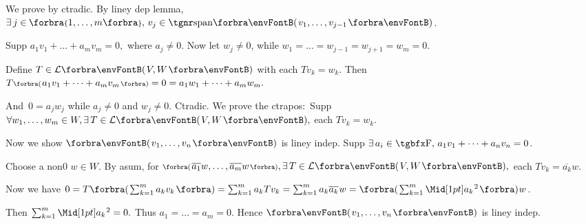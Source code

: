 \par\quad
We prove by ctradic. By liney dep lemma, $\exists\,j\in\;\!\!\Bra{1,\dots,m},\,v_j\in\Span{v_1,\dots,v_{j-1}}$.\par\quad
Supp $a_1 v_1+\dots+a_m v_m=0,$ where $a_j\neq 0.$ \;Now let $w_j\neq 0$, while $w_1=\dots=w_{j-1}=w_{j+1}=w_m=0.$\par\quad
Define $T\in\Lm{V,W}$ with each $Tv_k=w_k$. Then $T\BigPar{a_1 v_1+\dots+a_m v_m}=0=a_1 w_1+\dots+a_m w_m.$\par\quad
And \,$0=a_j w_j$ while $a_j\neq 0$ and $w_j\neq 0.$ Ctradic.\PfEnd\vspace{4pt}\quad
\Or We prove the ctrapos\hspace{1pt}: \,Supp $\forall w_1,\dots,w_m\in W,\exists\,T\in\Lm{V,W},$ each $Tv_k=w_k.$\par\quad
{Now we show $\Par{v_1,\dots,v_n}$ is liney indep. Supp {$\exists\,a_i\in\Fbb,\,a_1 v_1+\dots+a_n v_n=0$}.}\vspace{2pt}\par\quad
{Choose a non0 $w\in W.$ By asum, for {$\BigPar{\overline{a_1}w,\dots,\overline{a_m}w},\exists\,T\in\Lm{V,W},$ each $Tv_k=\overline{a_k}w.$}}\vspace{2pt}\par\quad
{Now we have {$ 0=T\BigBigPar{{\sum_{k=1}^m a_k v_k}}=\sum_{k=1}^m a_k Tv_k=\sum_{k=1}^m a_k\overline{a_k}\:\!w=\BigBigPar{{\sum_{k=1}^m \aMidsq{a_k}}}\:\!w$}.}\vspace{2pt}\par\quad
{Then {$\sum_{k=1}^m\aMidsq{a_k}=0.$ Thus $a_1=\dots=a_m=0.$} Hence $\Par{v_1,\dots,v_n}$ is liney indep.}\PfEnd
\SepLine

